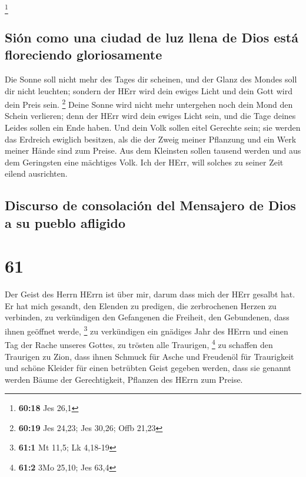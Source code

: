 \footnote{\textbf{60:18} Jes 26,1}

\hypertarget{siuxf3n-como-una-ciudad-de-luz-llena-de-dios-estuxe1-floreciendo-gloriosamente}{%
\subsection{Sión como una ciudad de luz llena de Dios está floreciendo
gloriosamente}\label{siuxf3n-como-una-ciudad-de-luz-llena-de-dios-estuxe1-floreciendo-gloriosamente}}

 Die Sonne soll nicht mehr des Tages dir scheinen, und
der Glanz des Mondes soll dir nicht leuchten; sondern der HErr wird dein
ewiges Licht und dein Gott wird dein Preis sein. \footnote{\textbf{60:19}
  Jes 24,23; Jes 30,26; Offb 21,23}  Deine Sonne wird
nicht mehr untergehen noch dein Mond den Schein verlieren; denn der HErr
wird dein ewiges Licht sein, und die Tage deines Leides sollen ein Ende
haben.  Und dein Volk sollen eitel Gerechte sein; sie
werden das Erdreich ewiglich besitzen, als die der Zweig meiner
Pflanzung und ein Werk meiner Hände sind zum Preise.  Aus
dem Kleinsten sollen tausend werden und aus dem Geringsten eine
mächtiges Volk. Ich der HErr, will solches zu seiner Zeit eilend
ausrichten.

\hypertarget{discurso-de-consolaciuxf3n-del-mensajero-de-dios-a-su-pueblo-afligido}{%
\subsection{Discurso de consolación del Mensajero de Dios a su pueblo
afligido}\label{discurso-de-consolaciuxf3n-del-mensajero-de-dios-a-su-pueblo-afligido}}

\hypertarget{section-60}{%
\section{61}\label{section-60}}

 Der Geist des Herrn HErrn ist über mir, darum dass mich
der HErr gesalbt hat. Er hat mich gesandt, den Elenden zu predigen, die
zerbrochenen Herzen zu verbinden, zu verkündigen den Gefangenen die
Freiheit, den Gebundenen, dass ihnen geöffnet werde, \footnote{\textbf{61:1}
  Mt 11,5; Lk 4,18-19}  zu verkündigen ein gnädiges Jahr
des HErrn und einen Tag der Rache unseres Gottes, zu trösten alle
Traurigen, \footnote{\textbf{61:2} 3Mo 25,10; Jes 63,4} 
zu schaffen den Traurigen zu Zion, dass ihnen Schmuck für Asche und
Freudenöl für Traurigkeit und schöne Kleider für einen betrübten Geist
gegeben werden, dass sie genannt werden Bäume der Gerechtigkeit,
Pflanzen des HErrn zum Preise.

